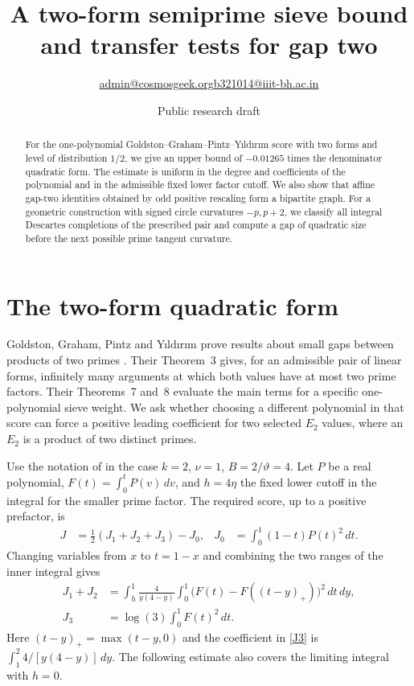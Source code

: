 \documentclass[11pt]{article}
\title{A two-form semiprime sieve bound and transfer tests for gap two}
\author{\small \href{mailto:admin@cosmosgeek.org}{admin@cosmosgeek.org}\qquad \href{mailto:b321014@iiit-bh.ac.in}{b321014@iiit-bh.ac.in}}
\date{Public research draft}
\begin{document}
\maketitle
\begin{abstract}
For the one-polynomial Goldston--Graham--Pintz--Y{\i}ld{\i}r{\i}m
score with two forms and level of distribution $1/2$, we give an
upper bound of $-0.01265$ times the denominator quadratic form.
The estimate is uniform in the degree and coefficients of the
polynomial and in the admissible fixed lower factor cutoff.
We also show that affine gap-two identities obtained by odd
positive rescaling form a bipartite graph. For a geometric construction
with signed circle curvatures $-p,p+2$, we classify all integral
Descartes completions of the prescribed pair and compute a gap
of quadratic size before the next possible prime tangent curvature.
\end{abstract}

\section{The two-form quadratic form}
Goldston, Graham, Pintz and Y{\i}ld{\i}r{\i}m prove results about
small gaps between products of two primes \cite{GGPY}. Their Theorem~3
gives, for an admissible pair of linear forms, infinitely many
arguments at which both values have at most two prime factors.
Their Theorems~7 and~8 evaluate the main terms for a specific
one-polynomial sieve weight. We ask whether choosing a different
polynomial in that score can force a positive leading coefficient
for two selected $E_2$ values, where an $E_2$ is a product of two
distinct primes.

Use the notation of \cite[Thms.~7--8 and \S8, (8.1)]{GGPY} in the
case $k=2$, $\nu=1$, $B=2/\vartheta=4$. Let $P$ be a real polynomial,
$F(t)=\int_0^tP(v)\,dv$, and $h=4\eta$ the fixed lower cutoff
in the integral for the smaller prime factor. The required score,
up to a positive prefactor, is
\begin{align}
J&=\tfrac12(J_1+J_2+J_3)-J_0,
&J_0&=\int_0^1(1-t)P(t)^2\,dt . \label{score}
\end{align}
Changing variables from $x$ to $t=1-x$ and combining the two
ranges of the inner integral gives
\begin{align}
J_1+J_2
 &=\int_h^1\frac{4}{y(4-y)}
       \int_0^1\bigl(F(t)-F((t-y)_+)\bigr)^2\,dt\,dy, \label{diff}\\
J_3&=\log(3)\int_0^1 F(t)^2\,dt. \label{J3}
\end{align}
Here $(t-y)_+=\max(t-y,0)$ and the coefficient in \eqref{J3} is
$\int_1^2 4/[y(4-y)]\,dy$. The following estimate also covers
the limiting integral with $h=0$.
\end{document}
